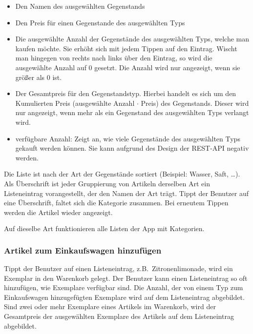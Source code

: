 \begin{itemize}
	\item Den Namen des ausgewählten Gegenstands

	\item Den Preis für einen Gegenstande des ausgewählten Typs

	\item Die ausgewählte Anzahl der Gegenstände des ausgewählten Typs, welche man kaufen möchte.
	Sie erhöht sich mit jedem Tippen auf den Eintrag.
	Wischt man hingegen von rechts nach links über den Eintrag, so wird die ausgewählte Anzahl auf 0 gesetzt.
	Die Anzahl wird nur angezeigt, wenn sie größer als 0 ist.

	\item Der Gesamtpreis für den Gegenstandstyp.
	Hierbei handelt es sich um den Kumulierten Preis (ausgewählte Anzahl $\cdot$ Preis) des Gegenstands.
	Dieser wird nur angezeigt, wenn mehr als ein Gegenstand des ausgewählten Typs verlangt wird.

	\item verfügbare Anzahl: Zeigt an, wie viele Gegenstände des ausgewählten Typs gekauft werden können.
	Sie kann aufgrund des Design der REST-API negativ werden.
\end{itemize}

Die Liste ist nach der Art der Gegenstände sortiert (Beispiel: Wasser, Saft, \ldots).
Als Überschrift ist jeder Gruppierung von Artikeln derselben Art ein Listeneintrag vorangestellt, der den Namen der Art trägt.
Tippt der Benutzer auf eine Überschrift, faltet sich die Kategorie zusammen.
Bei erneutem Tippen werden die Artikel wieder angezeigt.

Auf dieselbe Art funktionieren alle Listen der App mit Kategorien.

\subsubsection{Artikel zum Einkaufswagen hinzufügen} \label{subsubsec:shoppingcart-add-item}

Tippt der Benutzer auf einen Listeneintrag, z.B.\ Zitronenlimonade, wird ein Exemplar in den Warenkorb gelegt.
Der Benutzer kann einen Listeneintrag so oft hinzufügen, wie Exemplare verfügbar sind.
Die Anzahl, der von einem Typ zum Einkaufswagen hinzugefügten Exemplare wird auf dem Listeneintrag abgebildet.
Sind zwei oder mehr Exemplare eines Artikels im Warenkorb, wird der Gesamtpreis der ausgewählten Exemplare des Artikels auf dem Listeneintrag abgebildet.


